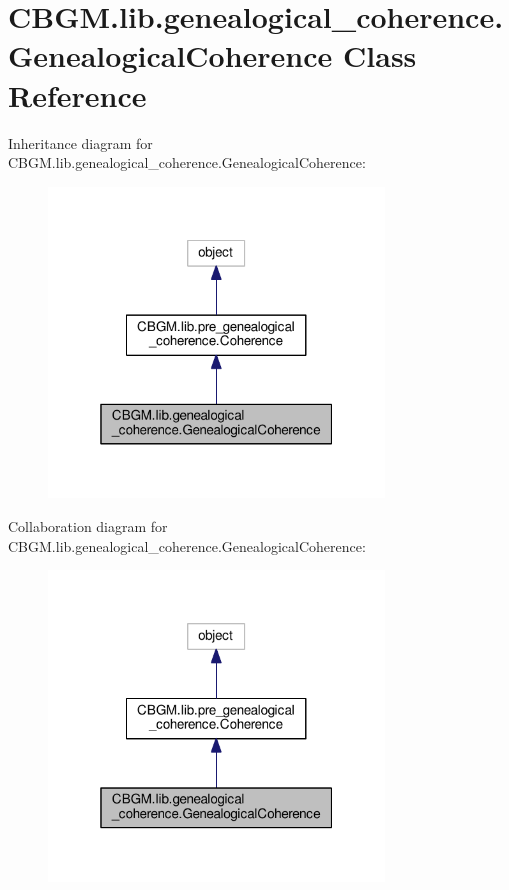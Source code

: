 \hypertarget{classCBGM_1_1lib_1_1genealogical__coherence_1_1GenealogicalCoherence}{}\section{C\+B\+G\+M.\+lib.\+genealogical\+\_\+coherence.\+Genealogical\+Coherence Class Reference}
\label{classCBGM_1_1lib_1_1genealogical__coherence_1_1GenealogicalCoherence}


Inheritance diagram for C\+B\+G\+M.\+lib.\+genealogical\+\_\+coherence.\+Genealogical\+Coherence\+:\nopagebreak
\begin{figure}[H]
\begin{center}
\leavevmode
\includegraphics[width=253pt]{classCBGM_1_1lib_1_1genealogical__coherence_1_1GenealogicalCoherence__inherit__graph}
\end{center}
\end{figure}


Collaboration diagram for C\+B\+G\+M.\+lib.\+genealogical\+\_\+coherence.\+Genealogical\+Coherence\+:\nopagebreak
\begin{figure}[H]
\begin{center}
\leavevmode
\includegraphics[width=253pt]{classCBGM_1_1lib_1_1genealogical__coherence_1_1GenealogicalCoherence__coll__graph}
\end{center}
\end{figure}

